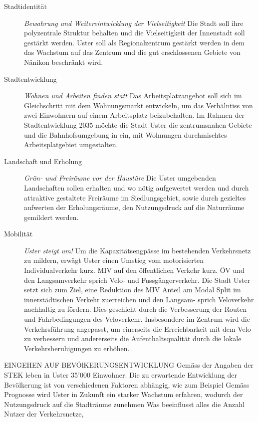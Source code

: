 \begin{description}
	\item[Stadtidentität]	\textit{Bewahrung und Weitereintwicklung der Vielseitigkeit} Die Stadt soll ihre polyzentrale Struktur behalten und die Vielseitigkeit der Innenstadt soll gestärkt werden. Uster soll als Regionalzentrum gestärkt werden in dem das Wachstum auf das Zentrum und die gut erschlossenen Gebiete von Nänikon beschränkt wird.
	\item[Stadtentwicklung]	\textit{Wohnen und Arbeiten finden statt} Das Arbeitsplatzangebot soll sich im Gleichschritt mit dem Wohnungsmarkt entwickeln, um das Verhälntiss von zwei Einwohnern auf einem Arbeitsplatz beizubehalten. Im Rahmen der Stadtentwicklung 2035 möchte die Stadt Uster die zentrumsnahen Gebiete und die Bahnhofsumgebung in ein, mit Wohnungen durchmischtes Arbeitsplatgebiet umgestalten. 
	\item[Landschaft und Erholung] \textit{Grün- und Freiräume vor der Haustüre} Die Uster umgebenden Landschaften sollen erhalten und wo nötig aufgewertet werden und durch attraktive gestaltete Freiräume im Siedlungsgebiet, sowie durch gezieltes aufwerten der Erholungsräume, den Nutzungsdruck auf die Naturräume gemildert werden. 
	\item[Mobilität] \textit{Uster steigt um!} Um die Kapazitätsengpässe im bestehenden Verkehrsnetz zu mildern, erwägt Uster einen Umstieg vom motorisierten Individualverkehr kurz. MIV auf den öffentlichen Verkehr kurz. ÖV und den Langsamverkehr sprich Velo- und Fussgängerverkehr. Die Stadt Uster setzt sich zum Ziel, eine Reduktion des MIV Anteil am Modal Split im innerstädtischen Verkehr zuerreichen und den Langsam- sprich Veloverkehr nachhaltig zu fördern. Dies geschieht durch die Verbesserung der Routen und Fahrbedingungen des Veloverkehr. Insbesondere im Zentrum wird die Verkehrsführung angepasst, um einerseits die Erreichbarkeit mit dem Velo zu verbessern und andererseits die Aufenthaltsqualität durch die lokale Verkehrsberuhigungen zu erhöhen.
\end{description}


EINGEHEN AUF BEVÖlKERUNGSENTWICKLUNG
Gemäss der Angaben der STEK leben in Uster 35'000 Einwohner. Die zu erwartende Entwicklung der Bevölkerung ist von verschiedenen Faktoren abhängig, wie zum Beispiel 
Gemäss Prognosse wird Uster in Zukunft ein starker Wachstum erfahren, wodurch der Nutzungsdruck auf die Stadträume zunehmen
Was beeinflusst alles die Anzahl Nutzer der Verkehrsnetze,

